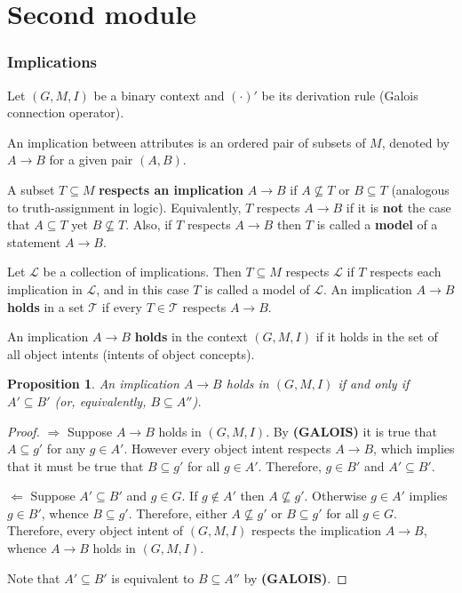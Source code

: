 \documentclass[a4paper]{article}
\newcommand{\brac}[1]{{\left ( #1 \right )}}
\newcommand{\Lcal}{\mathcal{L}}
\newcommand{\Tcal}{\mathcal{T}}
\newtheorem{prop}{Proposition}
\begin{document}
\part{Second module} %
\label{prt:second_module}

\section{Implications} %
\label{sec:implications}

Let $\brac{G,M,I}$ be a binary context and ${(\cdot)}'$ be its derivation rule (Galois connection operator).

An implication between attributes is an ordered pair of subsets of $M$, denoted by $A\to B$ for a given pair $(A,B)$.

A subset $T\subseteq M$ \textbf{respects an implication} $A\to B$ if $A\not\subseteq T$ or $B\subseteq T$ (analogous to truth-assignment in logic). Equivalently, $T$ respects $A\to B$ if it is \textbf{not} the case that $A\subseteq T$ yet $B\not\subseteq T$. Also, if $T$ respects $A\to B$ then $T$ is called a \textbf{model} of a statement $A\to B$.

Let $\Lcal$ be a collection of implications. Then $T\subseteq M$ respects $\Lcal$ if $T$ respects each implication in $\Lcal$, and in this case $T$ is called a model of $\Lcal$. An implication $A\to B$ \textbf{holds} in a set $\Tcal$ if every $T\in \Tcal$ respects $A\to B$.

An implication $A\to B$ \textbf{holds} in the context $(G,M,I)$ if it holds in the set of all object intents (intents of object concepts).

\begin{prop} An implication $A\to B$ holds in $(G,M,I)$ if and only if $A'\subseteq B'$ (or, equivalently, $B\subseteq A''$).
\end{prop}

\begin{proof}
$\Rightarrow$ Suppose $A\to B$ holds in $(G,M,I)$. By \textbf{(GALOIS)} it is true that $A\subseteq g'$ for any $g\in A'$. However every object intent respects $A\to B$, which implies that it must be true that $B\subseteq g'$ for all $g\in A'$. Therefore, $g\in B'$ and $A'\subseteq B'$.

$\Leftarrow$ Suppose $ A'\subseteq B'$ and $g\in G$. If $g\notin A'$ then $A\not\subseteq g'$. Otherwise $g\in A'$ implies $g\in B'$, whence $B\subseteq g'$. Therefore, either $A\not\subseteq g'$ or $B\subseteq g'$ for all $g\in G$. Therefore, every object intent of $(G,M,I)$ respects the implication $A\to B$, whence $A\to B$ holds in $(G,M,I)$.

Note that $A'\subseteq B'$ is equivalent to $B\subseteq A''$ by \textbf{(GALOIS)}.
\end{proof}
\end{document}
